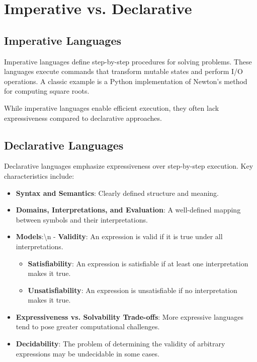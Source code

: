 \documentclass{book}
\providecommand{\tightlist}{%
  \setlength{\itemsep}{0pt}\setlength{\parskip}{0pt}}
\begin{document}
\hypertarget{book__pandoc__debug__src__languages.md__imperative-vs-declarative}{%
\section*{Imperative vs. Declarative}\label{book__pandoc__debug__src__languages.md__imperative-vs-declarative}}

\hypertarget{book__pandoc__debug__src__languages.md__imperative-languages}{%
\subsection*{Imperative Languages}\label{book__pandoc__debug__src__languages.md__imperative-languages}}

Imperative languages define step-by-step procedures for solving problems. These languages execute commands that transform mutable states and perform I/O operations. A classic example is a Python implementation of Newton's method for computing square roots.

While imperative languages enable efficient execution, they often lack expressiveness compared to declarative approaches.

\hypertarget{book__pandoc__debug__src__languages.md__declarative-languages}{%
\subsection*{Declarative Languages}\label{book__pandoc__debug__src__languages.md__declarative-languages}}

Declarative languages emphasize expressiveness over step-by-step execution. Key characteristics include:

\begin{itemize}
\tightlist
\item
  \textbf{Syntax and Semantics}: Clearly defined structure and meaning.
\item
  \textbf{Domains, Interpretations, and Evaluation}: A well-defined mapping between symbols and their interpretations.
\item
  \textbf{Models}:\textbackslash n  - \textbf{Validity}: An expression is valid if it is true under all interpretations.

  \begin{itemize}
  \tightlist
  \item
    \textbf{Satisfiability}: An expression is satisfiable if at least one interpretation makes it true.
  \item
    \textbf{Unsatisfiability}: An expression is unsatisfiable if no interpretation makes it true.
  \end{itemize}
\item
  \textbf{Expressiveness vs. Solvability Trade-offs}: More expressive languages tend to pose greater computational challenges.
\item
  \textbf{Decidability}: The problem of determining the validity of arbitrary expressions may be undecidable in some cases.
\end{itemize}
\end{document}
